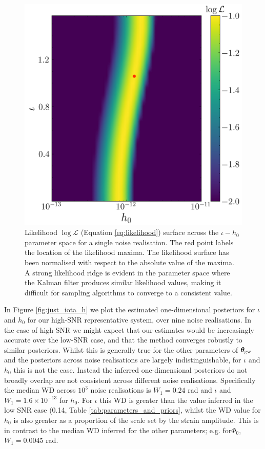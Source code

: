 \documentclass[fleqn,usenatbib,useAMS]{mnras}
\begin{document}
\begin{figure}
	\centering
	\includegraphics[width=\columnwidth]{images/likelihood_surface}
	\caption{Likelihood $\log \mathcal{L}$ (Equation \ref{eq:likelihood}) surface across the $\iota - h_0$ parameter space for a single noise realisation. The red point labels the location of the likelihood maxima. The likelihood surface has been normalised with respect to the absolute value of the maxima. A strong likelihood ridge is evident in the parameter space where the Kalman filter produces similar likelihood values, making it difficult for sampling algorithms to converge to a consistent value.}
	\label{fig:likelihood_surface}
\end{figure}
In Figure \ref{fig:just_iota_h} we plot the estimated one-dimensional posteriors for $\iota$ and $h_0$ for our high-SNR representative system, over nine noise realisations. In the case of high-SNR we might expect that our estimates would be increasingly accurate over the low-SNR case, and that the method converges robustly to similar posteriors. Whilst this is generally true for the other parameters of $\boldsymbol{\theta}_{\rm gw}$ and the posteriors across noise realisations are largely indistinguishable, for $\iota$ and $h_0$ this is not the case. Instead the inferred one-dimensional posteriors do not broadly overlap are not consistent across different noise realisations. Specifically the median WD across $10^3$ noise realisations is $W_1 = 0.24$ rad and $\iota$ and $W_1 = 1.6 \times 10^{-13}$ for $h_0$. For $\iota$ this WD is greater than the value inferred in the low SNR case (0.14, Table \ref{tab:parameters_and_priors}, whilst the WD value for $h_0$ is also greater as a proportion of the scale set by the strain amplitude. This is in contrast to the median WD inferred for the other parameters; e.g. for$\Phi_0$, $W_1 = 0.0045$ rad. \newline 
\end{document}
